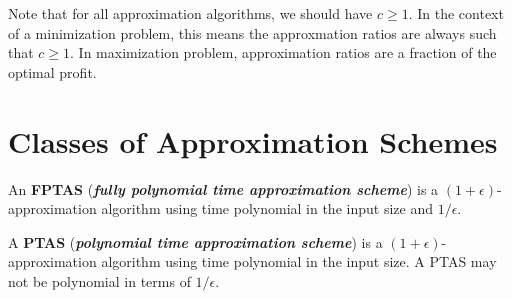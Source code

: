 Note that for all approximation algorithms, we should have $c \geq 1$. In the context of a minimization problem, this means the approxmation ratios are always such that $c \geq 1$. In maximization problem, approximation ratios are a fraction of the optimal profit.

\section{Classes of Approximation Schemes}  

An \textbf{FPTAS} (\textit{\textbf{fully polynomial time approximation scheme}}) is a $(1+\epsilon)$-approximation algorithm using time polynomial in the input size and $1/\epsilon$.

A \textbf{PTAS} (\textit{\textbf{polynomial time approximation scheme}}) is a $(1+\epsilon)$-approximation algorithm using time polynomial in the input size. A PTAS may not be polynomial in terms of $1/\epsilon$.
